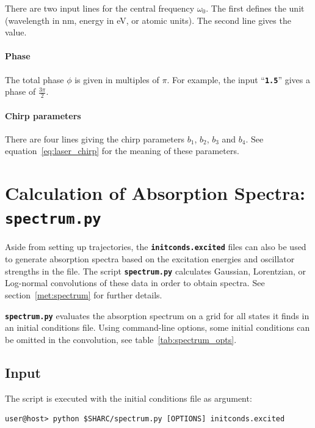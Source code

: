 \documentclass[a4paper,10pt,DIV=15,openany,twoside=false]{scrbook}
\newcommand{\ttt}[1]{\textbf{\texttt{#1}}}
\begin{document}
There are two input lines for the central frequency $\omega_0$. The first defines the unit (wavelength in nm, energy in eV, or atomic units). The second line gives the value.

\paragraph{Phase}

The total phase $\phi$ is given in multiples of $\pi$. For example, the input ``\ttt{1.5}'' gives a phase of $\frac{3\pi}{2}$.

\paragraph{Chirp parameters}

There are four lines giving the chirp parameters $b_1$, $b_2$, $b_3$ and $b_4$. See equation~\eqref{eq:laser_chirp} for the meaning of these parameters.








\section{Calculation of Absorption Spectra: \ttt{spectrum.py}}\label{sec:spectrum.py}

Aside from setting up trajectories, the \ttt{initconds.excited} files can also be used to generate absorption spectra based on the excitation energies and oscillator strengths in the file. The script \ttt{spectrum.py} calculates Gaussian, Lorentzian, or Log-normal convolutions of these data in order to obtain spectra. See section~\ref{met:spectrum} for further details.

\ttt{spectrum.py} evaluates the absorption spectrum on a grid for all states it finds in an initial conditions file. Using command-line options, some initial conditions can be omitted in the convolution, see table~\ref{tab:spectrum_opts}.

\subsection{Input}

The script is executed with the initial conditions file as argument:
\begin{verbatim}
user@host> python $SHARC/spectrum.py [OPTIONS] initconds.excited
\end{verbatim}
\end{document}
